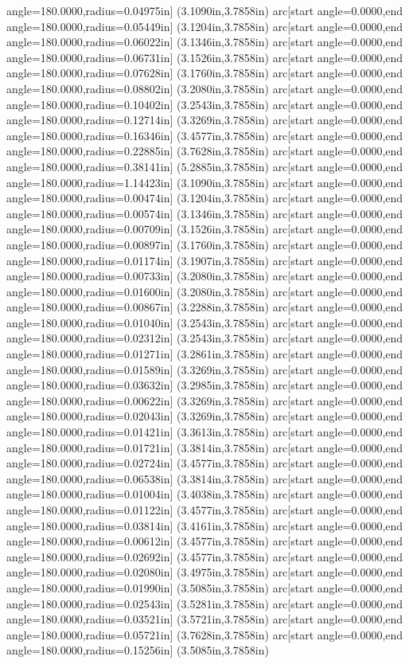 angle=180.0000,radius=0.04975in] (3.1090in,3.7858in) arc[start angle=0.0000,end angle=180.0000,radius=0.05449in] (3.1204in,3.7858in) arc[start angle=0.0000,end angle=180.0000,radius=0.06022in] (3.1346in,3.7858in) arc[start angle=0.0000,end angle=180.0000,radius=0.06731in] (3.1526in,3.7858in) arc[start angle=0.0000,end angle=180.0000,radius=0.07628in] (3.1760in,3.7858in) arc[start angle=0.0000,end angle=180.0000,radius=0.08802in] (3.2080in,3.7858in) arc[start angle=0.0000,end angle=180.0000,radius=0.10402in] (3.2543in,3.7858in) arc[start angle=0.0000,end angle=180.0000,radius=0.12714in] (3.3269in,3.7858in) arc[start angle=0.0000,end angle=180.0000,radius=0.16346in] (3.4577in,3.7858in) arc[start angle=0.0000,end angle=180.0000,radius=0.22885in] (3.7628in,3.7858in) arc[start angle=0.0000,end angle=180.0000,radius=0.38141in] (5.2885in,3.7858in) arc[start angle=0.0000,end angle=180.0000,radius=1.14423in] (3.1090in,3.7858in) arc[start angle=0.0000,end angle=180.0000,radius=0.00474in] (3.1204in,3.7858in) arc[start angle=0.0000,end angle=180.0000,radius=0.00574in] (3.1346in,3.7858in) arc[start angle=0.0000,end angle=180.0000,radius=0.00709in] (3.1526in,3.7858in) arc[start angle=0.0000,end angle=180.0000,radius=0.00897in] (3.1760in,3.7858in) arc[start angle=0.0000,end angle=180.0000,radius=0.01174in] (3.1907in,3.7858in) arc[start angle=0.0000,end angle=180.0000,radius=0.00733in] (3.2080in,3.7858in) arc[start angle=0.0000,end angle=180.0000,radius=0.01600in] (3.2080in,3.7858in) arc[start angle=0.0000,end angle=180.0000,radius=0.00867in] (3.2288in,3.7858in) arc[start angle=0.0000,end angle=180.0000,radius=0.01040in] (3.2543in,3.7858in) arc[start angle=0.0000,end angle=180.0000,radius=0.02312in] (3.2543in,3.7858in) arc[start angle=0.0000,end angle=180.0000,radius=0.01271in] (3.2861in,3.7858in) arc[start angle=0.0000,end angle=180.0000,radius=0.01589in] (3.3269in,3.7858in) arc[start angle=0.0000,end angle=180.0000,radius=0.03632in] (3.2985in,3.7858in) arc[start angle=0.0000,end angle=180.0000,radius=0.00622in] (3.3269in,3.7858in) arc[start angle=0.0000,end angle=180.0000,radius=0.02043in] (3.3269in,3.7858in) arc[start angle=0.0000,end angle=180.0000,radius=0.01421in] (3.3613in,3.7858in) arc[start angle=0.0000,end angle=180.0000,radius=0.01721in] (3.3814in,3.7858in) arc[start angle=0.0000,end angle=180.0000,radius=0.02724in] (3.4577in,3.7858in) arc[start angle=0.0000,end angle=180.0000,radius=0.06538in] (3.3814in,3.7858in) arc[start angle=0.0000,end angle=180.0000,radius=0.01004in] (3.4038in,3.7858in) arc[start angle=0.0000,end angle=180.0000,radius=0.01122in] (3.4577in,3.7858in) arc[start angle=0.0000,end angle=180.0000,radius=0.03814in] (3.4161in,3.7858in) arc[start angle=0.0000,end angle=180.0000,radius=0.00612in] (3.4577in,3.7858in) arc[start angle=0.0000,end angle=180.0000,radius=0.02692in] (3.4577in,3.7858in) arc[start angle=0.0000,end angle=180.0000,radius=0.02080in] (3.4975in,3.7858in) arc[start angle=0.0000,end angle=180.0000,radius=0.01990in] (3.5085in,3.7858in) arc[start angle=0.0000,end angle=180.0000,radius=0.02543in] (3.5281in,3.7858in) arc[start angle=0.0000,end angle=180.0000,radius=0.03521in] (3.5721in,3.7858in) arc[start angle=0.0000,end angle=180.0000,radius=0.05721in] (3.7628in,3.7858in) arc[start angle=0.0000,end angle=180.0000,radius=0.15256in] (3.5085in,3.7858in) 
